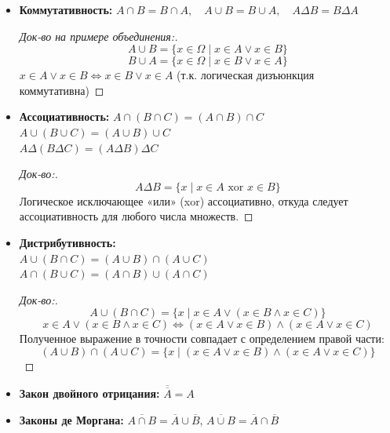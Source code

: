 \documentclass[10pt, a4paper]{article}
\begin{document}
\begin{itemize}
    \item \textbf{Коммутативность:} 
    $A \cap B = B \cap A, \quad A \cup B = B \cup A, \quad A \Delta B = B \Delta A$
    
    \vspace{0.2cm}
    \begin{proof}[Док-во на примере объединения:]
    \[ A \cup B = \{ x \in \Omega \mid x \in A \lor x \in B \} \]
    \[ B \cup A = \{ x \in \Omega \mid x \in B \lor x \in A \} \]
    $x \in A \lor x \in B \iff x \in B \lor x \in A$ (т.к. логическая дизъюнкция коммутативна)
    \end{proof}

    \vspace{0.1cm}
    \item \textbf{Ассоциативность:}
    $A \cap (B \cap C) = (A \cap B) \cap C$ \\
    $A \cup (B \cup C) = (A \cup B) \cup C$ \\
    $A \Delta (B \Delta C) = (A \Delta B) \Delta C$
    \begin{proof}[Док-во:]
    \[ A \Delta B = \{ x \mid x \in A \text{ xor } x \in B \} \]
    Логическое исключающее «или» (xor) ассоциативно, откуда следует ассоциативность для любого числа множеств.
    \end{proof}

    \vspace{0.3cm}
    \item \textbf{Дистрибутивность:} \\
    $A \cup (B \cap C) = (A \cup B) \cap (A \cup C)$ \\
    $A \cap (B \cup C) = (A \cap B) \cup (A \cap C)$
    
    \vspace{0.2cm}
    \begin{proof}[Док-во:]
    \[ A \cup (B \cap C) = \{ x \mid x \in A \lor (x \in B \land x \in C) \} \]
    \[ x \in A \lor (x \in B \land x \in C) \iff (x \in A \lor x \in B) \land (x \in A \lor x \in C) \]
    Полученное выражение в точности совпадает с определением правой части:
    \[ (A \cup B) \cap (A \cup C) = \{ x \mid (x \in A \lor x \in B) \land (x \in A \lor x \in C) \} \]
    \end{proof}
    \item \textbf{Закон двойного отрицания:}
    $\overline{\overline{A}} = A$

    \item \textbf{Законы де Моргана:} $\overline{A \cap B} = \overline{A} \cup \overline{B}$, \quad $\overline{A \cup B} = \overline{A} \cap \overline{B}$
    \end{itemize}
    
\end{document}
